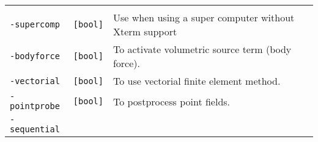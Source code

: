 \begin{longtable}[]{@{}lll@{}}
\begin{minipage}[t]{0.56\columnwidth}
\end{minipage}\tabularnewline
\begin{minipage}[t]{0.26\columnwidth}\raggedright\strut
\lstinline!-supercomp!\strut
\end{minipage} & \begin{minipage}[t]{0.09\columnwidth}\raggedright\strut
\lstinline![bool]!\strut
\end{minipage} & \begin{minipage}[t]{0.56\columnwidth}\raggedright\strut
Use when using a super computer without Xterm support\strut
\end{minipage}\tabularnewline
\begin{minipage}[t]{0.26\columnwidth}\raggedright\strut
\lstinline!-bodyforce!\strut
\end{minipage} & \begin{minipage}[t]{0.09\columnwidth}\raggedright\strut
\lstinline![bool]!\strut
\end{minipage} & \begin{minipage}[t]{0.56\columnwidth}\raggedright\strut
To activate volumetric source term (body force).\strut
\end{minipage}\tabularnewline
\begin{minipage}[t]{0.26\columnwidth}\raggedright\strut
\lstinline!-vectorial!\strut
\end{minipage} & \begin{minipage}[t]{0.09\columnwidth}\raggedright\strut
\lstinline![bool]!\strut
\end{minipage} & \begin{minipage}[t]{0.56\columnwidth}\raggedright\strut
To use vectorial finite element method.\strut
\end{minipage}\tabularnewline
\begin{minipage}[t]{0.26\columnwidth}\raggedright\strut
\lstinline!-pointprobe!\strut
\end{minipage} & \begin{minipage}[t]{0.09\columnwidth}\raggedright\strut
\lstinline![bool]!\strut
\end{minipage} & \begin{minipage}[t]{0.56\columnwidth}\raggedright\strut
To postprocess point fields.\strut
\end{minipage}\tabularnewline
\begin{minipage}[t]{0.26\columnwidth}\raggedright\strut
\lstinline!-sequential!\strut
\end{minipage} & \begin{minipage}[t]{0.09\columnwidth}\raggedright\strut

\end{minipage}
\end{longtable}
